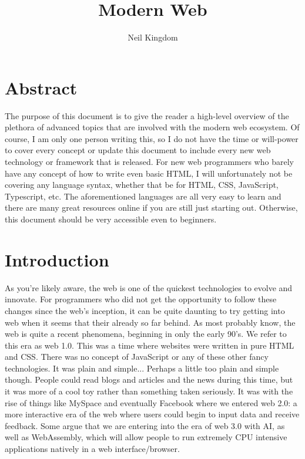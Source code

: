 \documentclass{article}
\title{Modern Web}
\author{Neil Kingdom}
\begin{document}
\begin{titlingpage}

\maketitle

\end{titlingpage}

\newpage

\tableofcontents

\newpage

\section{Abstract}

The purpose of this document is to give the reader a high-level overview of the plethora of advanced topics
that are involved with the modern web ecosystem. Of course, I am only one person writing this, so I do not
have the time or will-power to cover every concept or update this document to include every new web
technology or framework that is released. For new web programmers who barely have any concept of how to write
even basic HTML, I will unfortunately not be covering any language syntax, whether that be for HTML, CSS,
JavaScript, Typescript, etc. The aforementioned languages are all very easy to learn and there are many great
resources online if you are still just starting out. Otherwise, this document should be very accessible even
to beginners.

\section{Introduction}

As you're likely aware, the web is one of the quickest technologies to evolve and innovate. For programmers
who did not get the opportunity to follow these changes since the web's inception, it can be quite daunting to
try getting into web when it seems that their already so far behind. As most probably know, the web is quite a
recent phenomena, beginning in only the early 90's. We refer to this era as web 1.0. This was a time where
websites were written in pure HTML and CSS. There was no concept of JavaScript or any of these other fancy
technologies. It was plain and simple... Perhaps a little too plain and simple though. People could read blogs
and articles and the news during this time, but it was more of a cool toy rather than something taken seriously.
It was with the rise of things like MySpace and eventually Facebook where we entered web 2.0: a more interactive
era of the web where users could begin to input data and receive feedback. Some argue that we are entering into
the era of web 3.0 with AI, as well as WebAssembly, which will allow people to run extremely CPU intensive
applications natively in a web interface/browser.
\end{document}
